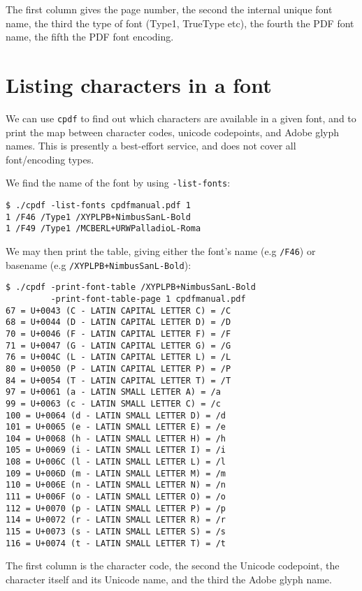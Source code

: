 \documentclass{book}
\begin{document}
\noindent The first column gives the page number, the second the internal unique font
name, the third the type of font (Type1, TrueType etc), the fourth the PDF font
name, the fifth the PDF font encoding.

\section{Listing characters in a font}
We can use \texttt{cpdf} to find out which characters are available in a given font, and to print the map between character codes, unicode codepoints, and Adobe glyph names. This is presently a best-effort service, and does not cover all font/encoding types.

We find the name of the font by using \texttt{-list-fonts}:

{\small\begin{verbatim}
$ ./cpdf -list-fonts cpdfmanual.pdf 1
1 /F46 /Type1 /XYPLPB+NimbusSanL-Bold 
1 /F49 /Type1 /MCBERL+URWPalladioL-Roma 
\end{verbatim}}

We may then print the table, giving either the font's name (e.g \texttt{/F46}) or basename (e.g \texttt{/XYPLPB+NimbusSanL-Bold}):

{\small\begin{verbatim}
$ ./cpdf -print-font-table /XYPLPB+NimbusSanL-Bold
         -print-font-table-page 1 cpdfmanual.pdf
67 = U+0043 (C - LATIN CAPITAL LETTER C) = /C
68 = U+0044 (D - LATIN CAPITAL LETTER D) = /D
70 = U+0046 (F - LATIN CAPITAL LETTER F) = /F
71 = U+0047 (G - LATIN CAPITAL LETTER G) = /G
76 = U+004C (L - LATIN CAPITAL LETTER L) = /L
80 = U+0050 (P - LATIN CAPITAL LETTER P) = /P
84 = U+0054 (T - LATIN CAPITAL LETTER T) = /T
97 = U+0061 (a - LATIN SMALL LETTER A) = /a
99 = U+0063 (c - LATIN SMALL LETTER C) = /c
100 = U+0064 (d - LATIN SMALL LETTER D) = /d
101 = U+0065 (e - LATIN SMALL LETTER E) = /e
104 = U+0068 (h - LATIN SMALL LETTER H) = /h
105 = U+0069 (i - LATIN SMALL LETTER I) = /i
108 = U+006C (l - LATIN SMALL LETTER L) = /l
109 = U+006D (m - LATIN SMALL LETTER M) = /m
110 = U+006E (n - LATIN SMALL LETTER N) = /n
111 = U+006F (o - LATIN SMALL LETTER O) = /o
112 = U+0070 (p - LATIN SMALL LETTER P) = /p
114 = U+0072 (r - LATIN SMALL LETTER R) = /r
115 = U+0073 (s - LATIN SMALL LETTER S) = /s
116 = U+0074 (t - LATIN SMALL LETTER T) = /t
\end{verbatim}}

The first column is the character code, the second the Unicode codepoint, the character itself and its Unicode name, and the third the Adobe glyph name.
\end{document}
